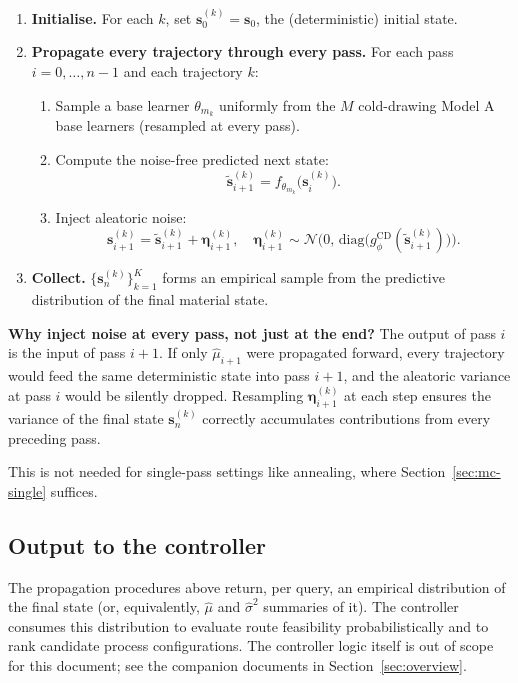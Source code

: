 \documentclass[11pt,a4paper]{article}
\begin{document}
\begin{enumerate}
    \item \textbf{Initialise.} For each $k$, set $\bm s_0^{(k)} = \bm s_0$, the (deterministic) initial state.
    \item \textbf{Propagate every trajectory through every pass.} For each pass $i = 0, \ldots, n-1$ and each trajectory $k$:
    \begin{enumerate}
        \item Sample a base learner $\theta_{m_k}$ uniformly from the $M$ cold-drawing Model A base learners (resampled at every pass).
        \item Compute the noise-free predicted next state:
        \[
        \tilde{\bm s}_{i+1}^{(k)} = f_{\theta_{m_k}}\!\big(\bm s_i^{(k)}\big).
        \]
        \item Inject aleatoric noise:
        \[
        \bm s_{i+1}^{(k)} = \tilde{\bm s}_{i+1}^{(k)} + \bm\eta_{i+1}^{(k)},
        \quad
        \bm\eta_{i+1}^{(k)} \sim \mathcal{N}\!\Big(0,\, \mathrm{diag}\big(g_\phi^{\text{CD}}(\tilde{\bm s}_{i+1}^{(k)})\big)\Big).
        \]
    \end{enumerate}
    \item \textbf{Collect.} $\{\bm s_n^{(k)}\}_{k=1}^K$ forms an empirical sample from the predictive distribution of the final material state.
\end{enumerate}

\begin{intuitionbox}
\textbf{Why inject noise at every pass, not just at the end?} The output of pass $i$ is the input of pass $i+1$. If only $\hat\mu_{i+1}$ were propagated forward, every trajectory would feed the same deterministic state into pass $i+1$, and the aleatoric variance at pass $i$ would be silently dropped. Resampling $\bm\eta_{i+1}^{(k)}$ at each step ensures the variance of the final state $\bm s_n^{(k)}$ correctly accumulates contributions from every preceding pass.

This is not needed for single-pass settings like annealing, where Section~\ref{sec:mc-single} suffices.
\end{intuitionbox}

\subsection{Output to the controller}

The propagation procedures above return, per query, an empirical distribution of the final state (or, equivalently, $\hat\mu$ and $\hat\sigma^2$ summaries of it). The controller consumes this distribution to evaluate route feasibility probabilistically and to rank candidate process configurations. The controller logic itself is out of scope for this document; see the companion documents in Section~\ref{sec:overview}.
\end{document}
